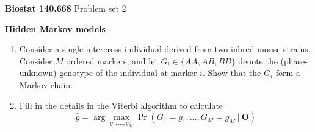 \documentclass[12pt]{article}
\begin{document}
\noindent \textbf{Biostat 140.668} \hfill Problem set 2

\bigskip 

\noindent \textbf{Hidden Markov models}

\begin{enumerate}

\item Consider a single intercross individual derived from two inbred
mouse strains.  Consider $M$ ordered markers, and let $G_i \in \{AA,
AB, BB\}$ denote the (phase-unknown) genotype of the individual at
marker $i$.  Show that the $G_i$ form a Markov chain.

\item Fill in the details in the Viterbi algorithm to calculate
$$ \hat{g} = \arg \max_{g_1, \dots, g_M} \Pr(G_1 = g_1, \dots, G_M =
g_M \ | \ \boldsymbol{O})$$

\end{enumerate}
\end{document}
